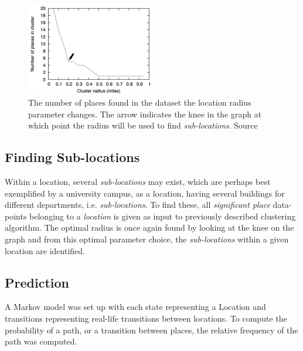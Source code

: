 \begin{figure}
    \centering
    \includegraphics[width=0.5\textwidth]{images/knee_graph.png}
    \caption{The number of places found in the dataset the location radius parameter changes. The arrow indicates the knee in the graph at which point the radius will be used to find \textit{sub-locations}. Source \cite{learning_significant_locations}}
    \label{fig:knee-graph}
\end{figure}

\subsection{Finding Sub-locations}
Within a location, several \textit{sub-locations} may exist, which are perhaps best exemplified by a university campus, as a location, having several buildings for different departments, i.e. \textit{sub-locations}. To find these, all \textit{significant place} data-points belonging to a \textit{location} is given as input to previously described clustering algorithm. The optimal radius is once again found by looking at the knee on the graph and from this optimal parameter choice, the \textit{sub-locations} within a given location are identified.

\subsection{Prediction}
A Markov model was set up with each state representing a Location and transitions representing real-life transitions between locations. To compute the probability of a path, or a transition between places, the relative frequency of the path was computed.

